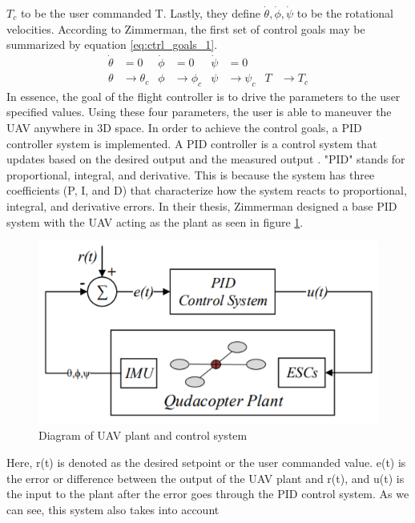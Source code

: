 \documentclass[english]{upeeei}
\begin{document}
$T_c$ to be the user commanded T. Lastly, they define $ \dot{\theta}, \dot{\phi}, \dot{\psi}$ to be the rotational velocities. According to
Zimmerman, the first set of control goals may be summarized by equation \ref{eq:ctrl_goals_1}.
\begin{align}
    \dot{\theta}&=0                      &  \dot{\phi} &=0                 &  \dot{\psi}&=0\\
    \label{eq:ctrl_goals_1} 
    \theta &\rightarrow \theta_c         & 
     \phi &\rightarrow \phi_c       &  \psi &\rightarrow \psi_c &  T &\rightarrow T_c
\end{align}
In essence, the goal of the flight controller is to drive the parameters to the user specified values. Using these four parameters, the user
is able to maneuver the UAV anywhere in 3D space. In order to achieve the control goals, a PID controller system is implemented. A PID controller is a
control system that updates based on the desired output and the measured output \cite{zimmerman2016}. "PID" stands for proportional, integral,
and derivative. This is because the system has three coefficients (P, I, and D) that characterize how the system reacts to proportional, integral, 
and derivative errors. In their thesis, Zimmerman designed a base PID system with the UAV acting as the plant as seen in figure \ref{fig:basePID}.
\begin{figure}[h]
    \centering
    \includegraphics[scale=0.5]{images/basePID.PNG}
    \caption{Diagram of UAV plant and control system \cite{zimmerman2016}}
    \label{fig:basePID}
\end{figure}
Here, r(t) is denoted as the desired setpoint or the user commanded value. e(t) is the error or difference between the output of the UAV plant and
r(t), and u(t) is the input to the plant after the error goes through the PID control system. As we can see, this system also takes into account
\end{document}
